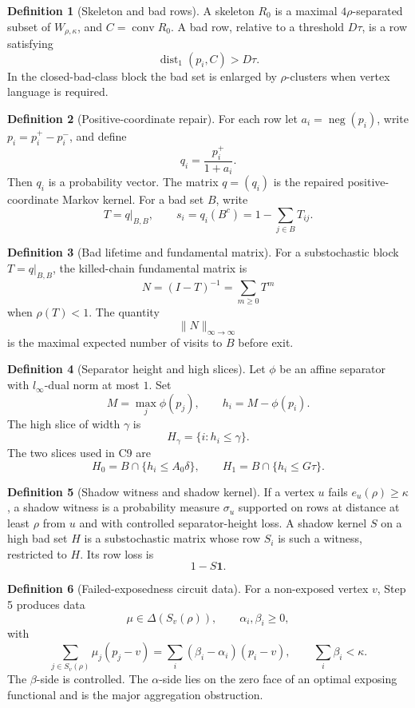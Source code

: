 \documentclass[11pt]{article}
\newcommand{\one}{\mathbf{1}}
\newcommand{\conv}{\operatorname{conv}}
\newcommand{\dist}{\operatorname{dist}}
\newcommand{\negm}{\operatorname{neg}}
\theoremstyle{definition}
\newtheorem{definition}{Definition}
\begin{document}
\begin{definition}[Skeleton and bad rows]
A skeleton \(R_0\) is a maximal \(4\rho\)-separated subset of
\(W_{\rho,\kappa}\), and \(C=\conv R_0\).  A bad row, relative to a threshold
\(D\tau\), is a row satisfying
\[
  \dist_1(p_i,C)>D\tau.
\]
In the closed-bad-class block the bad set is enlarged by \(\rho\)-clusters
when vertex language is required.
\end{definition}

\begin{definition}[Positive-coordinate repair]
For each row let \(a_i=\negm(p_i)\), write \(p_i=p_i^+-p_i^-\), and define
\[
  q_i=\frac{p_i^+}{1+a_i}.
\]
Then \(q_i\) is a probability vector.  The matrix \(q=(q_i)\) is the repaired
positive-coordinate Markov kernel.  For a bad set \(B\), write
\[
  T=q|_{B,B},\qquad s_i=q_i(B^c)=1-\sum_{j\in B}T_{ij}.
\]
\end{definition}

\begin{definition}[Bad lifetime and fundamental matrix]
For a substochastic block \(T=q|_{B,B}\), the killed-chain fundamental matrix
is
\[
  N=(I-T)^{-1}=\sum_{m\geq0}T^m
\]
when \(\rho(T)<1\).  The quantity
\[
  \|N\|_{\infty\to\infty}
\]
is the maximal expected number of visits to \(B\) before exit.
\end{definition}

\begin{definition}[Separator height and high slices]
Let \(\phi\) be an affine separator with \(l_\infty\)-dual norm at most \(1\).
Set
\[
  M=\max_j\phi(p_j),\qquad h_i=M-\phi(p_i).
\]
The high slice of width \(\gamma\) is
\[
  H_\gamma=\{i:h_i\leq\gamma\}.
\]
The two slices used in C9 are
\[
  H_0=B\cap\{h_i\leq A_0\delta\},\qquad
  H_1=B\cap\{h_i\leq G\tau\}.
\]
\end{definition}

\begin{definition}[Shadow witness and shadow kernel]
If a vertex \(u\) fails \(e_u(\rho)\geq\kappa\), a shadow witness is a
probability measure \(\sigma_u\) supported on rows at distance at least
\(\rho\) from \(u\) and with controlled separator-height loss.  A shadow
kernel \(S\) on a high bad set \(H\) is a substochastic matrix whose row
\(S_i\) is such a witness, restricted to \(H\).  Its row loss is
\[
  1-S\one.
\]
\end{definition}

\begin{definition}[Failed-exposedness circuit data]
For a non-exposed vertex \(v\), Step 5 produces data
\[
  \mu\in\Delta(S_v(\rho)),\qquad \alpha_i,\beta_i\geq0,
\]
with
\[
  \sum_{j\in S_v(\rho)}\mu_j(p_j-v)
  =
  \sum_i(\beta_i-\alpha_i)(p_i-v),\qquad
  \sum_i\beta_i<\kappa.
\]
The \(\beta\)-side is controlled.  The \(\alpha\)-side lies on the zero face
of an optimal exposing functional and is the major aggregation obstruction.
\end{definition}
\end{document}
